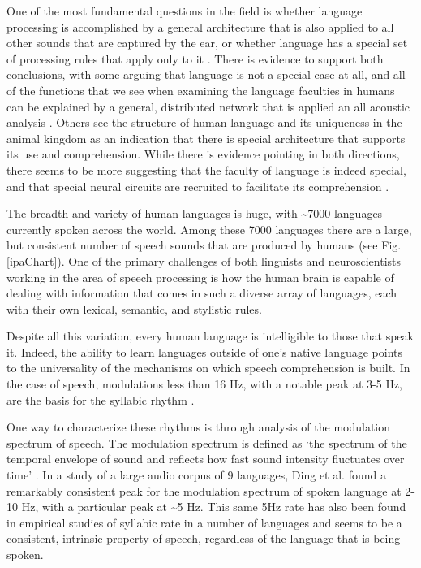 \documentclass[titlepage]{article}
\begin{document}
    One of the most fundamental questions in the field is whether language processing
    is accomplished by a general architecture that is also applied to all other sounds
    that are captured by the ear, or whether language has a special set of processing
    rules that apply only to it \cite{Uddin2018}. There is evidence to support both
    conclusions, with some arguing that language is not a special case at all, and all
    of the functions that we see when examining the language faculties in humans can be
    explained by a general, distributed network that is applied an all acoustic analysis
    \cite{Dick2001}. Others see the structure of human language and its uniqueness in the
    animal kingdom \cite{Chomsky1986,Fodor1983} as an indication that there is special
    architecture that supports its use and comprehension. While there is evidence 
    pointing in both directions, there seems to be more suggesting that the faculty 
    of language is indeed special, and that special neural circuits are recruited 
    to facilitate its comprehension \cite{Pinker2005}.

    The breadth and variety of human languages is huge, with
    \textasciitilde 7000 \cite{Simons2017} languages currently spoken across 
    the world. Among these 7000 languages
    there are a large, but consistent number of speech sounds that are produced 
    by humans (see Fig.\ref{ipaChart}). One of the primary challenges of both
    linguists and neuroscientists working in the area of speech processing is
    how the human brain is capable of dealing with information that comes in 
    such a diverse array of languages, each with their own lexical, semantic, 
    and stylistic rules.

    Despite all this variation, every human language is intelligible to those 
    that speak it. Indeed, the ability to learn languages outside of one's 
    native language points to the universality of the mechanisms on which 
    speech comprehension is built. In the case of speech, modulations less than 
    16 Hz, with a notable peak at 3-5 Hz, are the basis for the syllabic rhythm 
    \cite{Giraud2012,Greenberg2003}.

    One way to characterize these rhythms is through analysis of the modulation spectrum of
    speech. The modulation spectrum is defined as 
    `the spectrum of the temporal envelope of sound and
    reflects how fast sound intensity fluctuates over time' \cite{Ding2017}. In a study of
    a large audio corpus of 9 languages, Ding et al. \cite{Ding2017} found a remarkably
    consistent peak for the modulation spectrum of spoken language at 2-10 Hz, with a particular
    peak at \textasciitilde 5 Hz. This same 5Hz rate has also been found in empirical studies of syllabic
    rate in a number of languages \cite{Pellegrino2011} and seems to be a consistent, intrinsic
    property of speech, regardless of the language that is being spoken.
\end{document}

